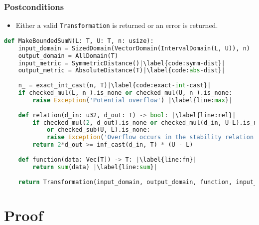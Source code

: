 \documentclass[11pt,a4paper]{article}
\theoremstyle{definition}
\begin{document}
\subsubsection*{Postconditions}
\begin{itemize}
    \item Either a valid \texttt{Transformation} is returned or an error is returned.
\end{itemize}

\begin{lstlisting}[language=Python, escapechar=|]
def MakeBoundedSumN(L: T, U: T, n: usize):
    input_domain = SizedDomain(VectorDomain(IntervalDomain(L, U)), n)
    output_domain = AllDomain(T)
    input_metric = SymmetricDistance()|\label{code:symm-dist}|
    output_metric = AbsoluteDistance(T)|\label{code:abs-dist}|
    
    n_ = exact_int_cast(n, T)|\label{code:exact-int-cast}|
    if checked_mul(L, n_).is_none or checked_mul(U, n_).is_none: 
        raise Exception('Potential overflow') |\label{line:max}|
    
    def relation(d_in: u32, d_out: T) -> bool: |\label{line:rel}|
        if checked_mul(2, d_out).is_none or checked_mul(d_in, U-L).is_none
            or checked_sub(U, L).is_none:
            raise Exception('Overflow occurs in the stability relation')
        return 2*d_out >= inf_cast(d_in, T) * (U - L)
    
    def function(data: Vec[T]) -> T: |\label{line:fn}|
        return sum(data) |\label{line:sum}|
    
    return Transformation(input_domain, output_domain, function, input_metric, output_metric, stability_relation = relation)
\end{lstlisting}

\section{Proof}
\end{document}
